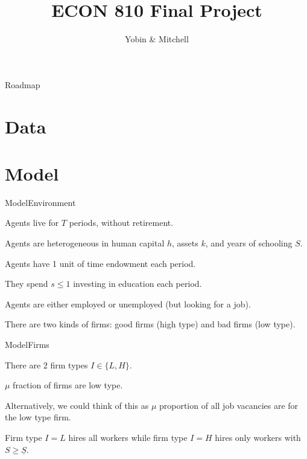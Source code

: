 \documentclass[notes, 10pt]{beamer}
\title{ECON 810 Final Project}
\date{\displaydate{duedate}}
\author{Yobin  \& Mitchell}
\newenvironment{wideitemize}{\itemize\addtolength{\itemsep}{10pt}}{\enditemize}
\begin{document}
	\begin{frame}
		\maketitle
	\end{frame}

	\begin{frame}{Roadmap}
		\tableofcontents
	\end{frame}
	
	\section{Data}
	\begin{frame}
		
	\end{frame}
	\section{Model}
	\begin{frame}{Model}{Environment}
		\begin{wideitemize}
			\item Agents live for $ T $ periods, without retirement. 
			\item Agents are heterogeneous in human capital $ h $, assets $ k $, and years of schooling $S$. 
			\item Agents have 1 unit of time endowment each period.
			\item They spend $ s \leq 1$ investing in education each period.
			\item Agents are either employed or unemployed (but looking for a job).
			\item There are two kinds of firms: good firms (high type) and bad firms (low type).
		\end{wideitemize}
	\end{frame}

	\begin{frame}[c]{Model}{Firms}
		\begin{wideitemize}
			\item There are $2$ firm types $I \in \{L,H\}$.
			\item $ \mu $ fraction of firms are low type.
			\begin{wideitemize}
				\item  Alternatively, we could think of this as $\mu$ proportion of all job vacancies are for the low type firm.
			\end{wideitemize}
			\item Firm type $I=L$ hires all workers while firm type $I=H$ hires only workers with $S \geq \underline{S}$.
		\end{wideitemize}
	\end{frame}
\end{document}

